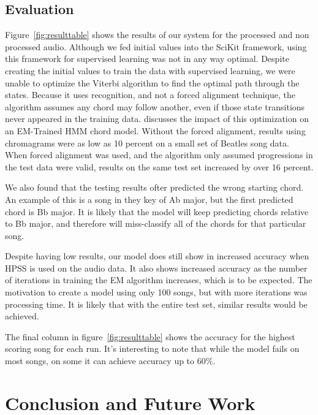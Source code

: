 \documentclass{article}
\begin{document}
\subsection{Evaluation}

Figure~\ref{fig:resulttable} shows the results of our system for the processed
and non processed audio. Although we fed initial values into the SciKit
framework, using this framework for supervised learning was not in any way
optimal.  Despite creating the initial values to train the data with supervised
learning, we were unable to optimize the Viterbi algorithm to find the optimal
path through the states. Because it uses recognition, and not a forced
alignment technique, the algorithm assumes any chord may follow another, even
if those state transitions never appeared in the training data.
\cite{Danellis:23} discusses the impact of this optimization on an EM-Trained
HMM chord model. Without the forced alignment, results using chromagrams were
as low as 10 percent on a small set of Beatles song data. When forced alignment
was used, and the algorithm only assumed progressions in the test data were
valid, results on the same test set increased by over 16 percent.

We also found that the testing results ofter predicted the wrong starting
chord. An example of this is a song in they key of Ab major, but the first
predicted chord is Bb major. It is likely that the model will keep predicting
chords relative to Bb major, and therefore will miss-classify all of the chords
for that particular song.

Despite having low results, our model does still show in increased accuracy
when HPSS is used on the audio data. It also shows increased accuracy as the
number of iterations in training the EM algorithm increases, which is to be
expected. The motivation to create a model using only 100 songs, but with more
iterations was processing time. It is likely that with the entire test set,
similar results would be achieved.

The final column in figure~\ref{fig:resulttable} shows the accuracy for the
highest scoring song for each run. It's interesting to note that while the
model fails on most songs, on some it can achieve accuracy up to 60\%.

\section{Conclusion and Future Work}
\end{document}
